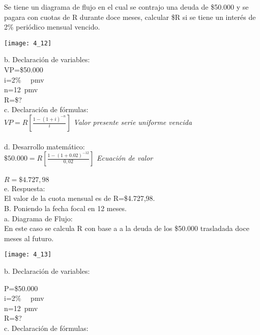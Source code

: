 {Se tiene un diagrama de flujo en el cual se contrajo una deuda de \$50.000 y se pagara con cuotas de R durante doce meses, calcular \$R si se tiene un interés de 2\% periódico mensual vencido.
\begin{center}
	\texttt{[image: 4\_12]}
\end{center}

b. Declaración de variables:\\

	VP=\$50.000
	\\
	i=2\% \ \ pmv\\
	n=12\ pmv
	\\
	R=\$?
	\\
c. Declaración de fórmulas:\\

	$VP=R [\frac{1-(1+i)^{-n}}{i}]$  \hspace{35}\textit{Valor presente  serie  uniforme vencida}\\
    \\

d. Desarrollo matemático:\\

	$\$50.000=R[\frac{1-(1+0.02)^{-12}}{0,02}] $ \hspace{35}\textit{Ecuación de valor}
	\\\\
$	R=\$4.727,98$\\

e. Respuesta:\\

El valor de la cuota mensual es de R=\$4.727,98. \\


B. Poniendo la fecha focal en 12 meses.\\

a. Diagrama de Flujo:\\
En este caso se calcula R con base a a la deuda de los \$50.000 trasladada doce meses al futuro.
\begin{center}
	\texttt{[image: 4\_13]}
\end{center}

b. Declaración de variables:

	P=\$50.000
	\\
	i=2\% \ \ pmv\\
	n=12\ pmv
	\\
	R=\$?
	\\

c. Declaración de fórmulas:


}
